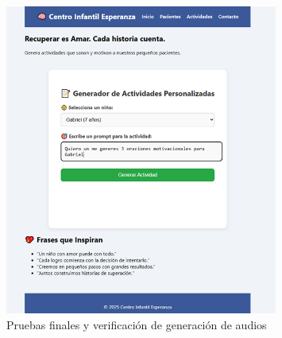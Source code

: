 \begin{enumerate}
\vspace{0.5cm}
\begin{figure}[H]
    \centering
    \includegraphics[width=0.8\textwidth]{imagenes/pruebas_finales.png}
    \caption{Pruebas finales y verificación de generación de audios}
    \label{fig:pruebas_finales}
\end{figure}
\vspace{0.5cm}

\end{enumerate}
